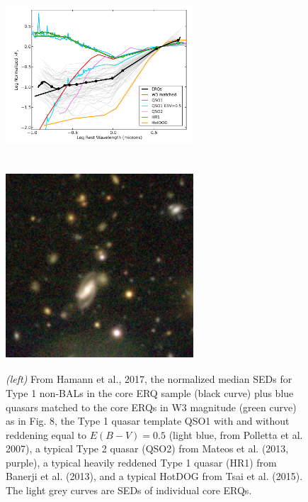 \documentclass[12pt]{article}
\begin{document}
\hspace{-2.5cm}
\begin{figure}[h]
  \begin{center}
    \hspace{-0.5cm}
    \includegraphics[height=7.0cm,width=7.0cm]{../Figures/Hamann2017_Fig16_SEDs.png}
    \includegraphics[height=7.0cm,width=7.0cm]{../Figures/ERQ_HSC1.png}
    \vspace{-10pt}
    \caption{
      \footnotesize
      {\it (left)} From Hamann et al., 2017, the normalized median
      SEDs for Type 1 non-BALs in the core ERQ sample (black curve) plus
      blue quasars matched to the core ERQs in W3 magnitude (green curve) as
      in Fig. 8, the Type 1 quasar template QSO1 with and without reddening
      equal to $E(B − V) = 0.5$ (light blue, from Polletta et al. 2007), a
      typical Type 2 quasar (QSO2) from Mateos et al. (2013, purple), a
      typical heavily reddened Type 1 quasar (HR1) from Banerji et
      al. (2013), and a typical HotDOG from Tsai et al. (2015). The light
      grey curves are SEDs of individual core ERQs.
    }
    \vspace{-14pt}
    \label{figtest-fig}
  \end{center}
\end{figure}
\end{document}
